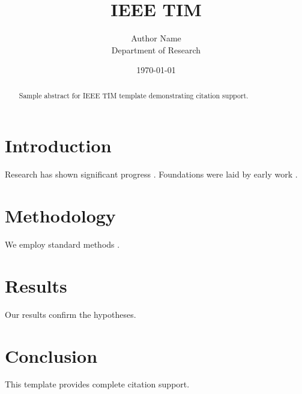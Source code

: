 ﻿\documentclass{IEEEtran}
\title{IEEE TIM}
\author{Author Name \\ \small Department of Research}
\date{\today}
\begin{document}
\maketitle

\begin{abstract}
Sample abstract for IEEE TIM template demonstrating citation support.
\end{abstract}

\section{Introduction}
Research has shown significant progress \citep{einstein1905}. Foundations were laid by early work \citep{turing1950}.

\section{Methodology}
We employ standard methods \citep{knuth1984}.

\section{Results}
Our results confirm the hypotheses.

\section{Conclusion}
This template provides complete citation support.



\end{document}
